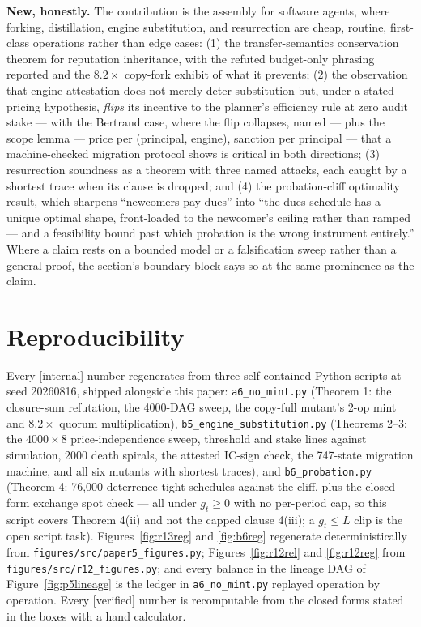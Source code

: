 \documentclass[11pt,a4paper]{article}
\begin{document}
\textbf{New, honestly.} The contribution is the assembly for software agents, where forking, distillation, engine substitution,
and resurrection are cheap, routine, first-class operations rather than edge cases: (1) the transfer-semantics conservation
theorem for reputation inheritance, with the refuted budget-only phrasing reported and the $8.2\times$ copy-fork exhibit of what it
prevents; (2) the observation that engine attestation does not merely deter substitution but, under a stated pricing hypothesis,
\emph{flips} its incentive to the planner's efficiency rule at zero audit stake --- with the Bertrand case, where the flip
collapses, named --- plus the scope lemma --- price per (principal, engine), sanction per principal ---
that a machine-checked migration protocol shows is critical in both directions; (3) resurrection soundness as a theorem with
three named attacks, each caught by a shortest trace when its clause is dropped; and (4) the probation-cliff optimality result,
which sharpens ``newcomers pay dues'' into ``the dues schedule has a unique optimal shape, front-loaded to the newcomer's ceiling
rather than ramped --- and a feasibility bound past which probation is the wrong instrument entirely.'' Where a claim
rests on a bounded model or a falsification sweep rather than a general proof, the section's boundary block says so at the same
prominence as the claim.

\section*{Reproducibility}

Every [internal] number regenerates from three self-contained Python scripts at seed 20260816, shipped alongside this paper:
\texttt{a6\_\allowbreak no\_\allowbreak mint.py} (Theorem 1: the closure-sum refutation, the 4000-DAG sweep, the copy-full mutant's 2-op mint and
$8.2\times$ quorum multiplication), \texttt{b5\_\allowbreak engine\_\allowbreak substitution.py} (Theorems 2--3: the $4000\times 8$ price-independence
sweep, threshold and stake lines against simulation, 2000 death spirals, the attested IC-sign check, the 747-state migration
machine, and all six mutants with shortest traces), and \texttt{b6\_\allowbreak probation.py} (Theorem 4: 76{,}000 deterrence-tight schedules
against the cliff, plus the closed-form exchange spot check --- all under $g_t\ge0$ with no per-period cap, so this script covers
Theorem 4(ii) and not the capped clause 4(iii); a $g_t\le L$ clip is the open script task). Figures~\ref{fig:r13reg} and \ref{fig:b6reg} regenerate deterministically from
\texttt{figures/\allowbreak src/\allowbreak paper5\_\allowbreak figures.py}; Figures~\ref{fig:r12rel} and \ref{fig:r12reg} from
\texttt{figures/\allowbreak src/\allowbreak r12\_\allowbreak figures.py}; and every balance in the lineage DAG of Figure~\ref{fig:p5lineage} is the ledger in
\texttt{a6\_\allowbreak no\_\allowbreak mint.py} replayed operation by operation. Every [verified]
number is recomputable from the closed forms stated in the boxes with a hand calculator.
\end{document}
